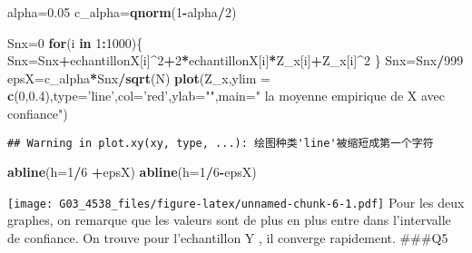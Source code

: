 \documentclass[]{article}
\newenvironment{Shaded}{\begin{snugshade}}{\end{snugshade}}
\newcommand{\KeywordTok}[1]{\textcolor[rgb]{0.13,0.29,0.53}{\textbf{#1}}}
\newcommand{\DataTypeTok}[1]{\textcolor[rgb]{0.13,0.29,0.53}{#1}}
\newcommand{\DecValTok}[1]{\textcolor[rgb]{0.00,0.00,0.81}{#1}}
\newcommand{\FloatTok}[1]{\textcolor[rgb]{0.00,0.00,0.81}{#1}}
\newcommand{\StringTok}[1]{\textcolor[rgb]{0.31,0.60,0.02}{#1}}
\newcommand{\ControlFlowTok}[1]{\textcolor[rgb]{0.13,0.29,0.53}{\textbf{#1}}}
\newcommand{\OperatorTok}[1]{\textcolor[rgb]{0.81,0.36,0.00}{\textbf{#1}}}
\newcommand{\NormalTok}[1]{#1}
\begin{document}
\begin{Shaded}
\begin{Highlighting}[]
\NormalTok{alpha=}\FloatTok{0.05}
\NormalTok{c_alpha=}\KeywordTok{qnorm}\NormalTok{(}\DecValTok{1}\OperatorTok{-}\NormalTok{alpha}\OperatorTok{/}\DecValTok{2}\NormalTok{)}

\NormalTok{Snx=}\DecValTok{0}  
\ControlFlowTok{for}\NormalTok{(i }\ControlFlowTok{in} \DecValTok{1}\OperatorTok{:}\DecValTok{1000}\NormalTok{)\{}
\NormalTok{  Snx=Snx}\OperatorTok{+}\NormalTok{echantillonX[i]}\OperatorTok{^}\DecValTok{2}\OperatorTok{+}\DecValTok{2}\OperatorTok{*}\NormalTok{echantillonX[i]}\OperatorTok{*}\NormalTok{Z_x[i]}\OperatorTok{+}\NormalTok{Z_x[i]}\OperatorTok{^}\DecValTok{2}
\NormalTok{\}}
\NormalTok{Snx=Snx}\OperatorTok{/}\DecValTok{999}
\NormalTok{epsX=c_alpha}\OperatorTok{*}\NormalTok{Snx}\OperatorTok{/}\KeywordTok{sqrt}\NormalTok{(N)}
\KeywordTok{plot}\NormalTok{(Z_x,}\DataTypeTok{ylim =} \KeywordTok{c}\NormalTok{(}\DecValTok{0}\NormalTok{,}\FloatTok{0.4}\NormalTok{),}\DataTypeTok{type=}\StringTok{'line'}\NormalTok{,}\DataTypeTok{col=}\StringTok{'red'}\NormalTok{,}\DataTypeTok{ylab=}\StringTok{""}\NormalTok{,}\DataTypeTok{main=}\StringTok{" la moyenne empirique de X avec confiance"}\NormalTok{)}
\end{Highlighting}
\end{Shaded}

\begin{verbatim}
## Warning in plot.xy(xy, type, ...): 绘图种类'line'被缩短成第一个字符
\end{verbatim}

\begin{Shaded}
\begin{Highlighting}[]
\KeywordTok{abline}\NormalTok{(}\DataTypeTok{h=}\DecValTok{1}\OperatorTok{/}\DecValTok{6} \OperatorTok{+}\NormalTok{epsX)}
\KeywordTok{abline}\NormalTok{(}\DataTypeTok{h=}\DecValTok{1}\OperatorTok{/}\DecValTok{6}\OperatorTok{-}\NormalTok{epsX)}
\end{Highlighting}
\end{Shaded}

\texttt{[image: G03\_4538\_files/figure-latex/unnamed-chunk-6-1.pdf]} Pour
les deux graphes, on remarque que les valeurs sont de plus en plus entre
dans l'intervalle de confiance. On trouve pour l'echantillon Y , il
converge rapidement. \#\#\#Q5
\end{document}
